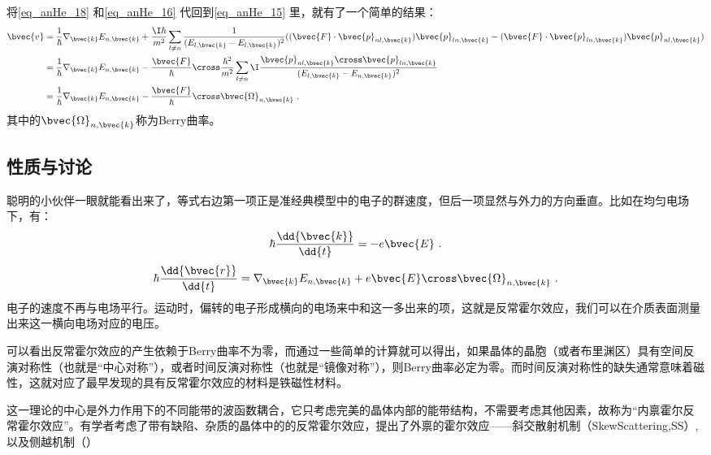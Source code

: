 将\autoref{eq_anHe_18} 和\autoref{eq_anHe_16} 代回到\autoref{eq_anHe_15} 里，就有了一个简单的结果：
\begin{equation}
\begin{aligned}
\bvec{v}&=\frac{1}{\hbar}\nabla_{\bvec{k}}E_{n,\bvec{k}}+\frac{\I\hbar}{m^2}\sum_{l\neq n}\frac{1}{(E_{l,\bvec{k}}-E_{l,\bvec{k}})^2}((\bvec{F}\cdot\bvec{p}_{nl,\bvec{k}})\bvec{p}_{ln,\bvec{k}}-(\bvec{F}\cdot\bvec{p}_{ln,\bvec{k}})\bvec{p}_{nl,\bvec{k}})\\
&=\frac{1}{\hbar}\nabla_{\bvec{k}}E_{n,\bvec{k}}-\frac{\bvec{F}}{\hbar}\cross\frac{\hbar^2}{m^2}\sum_{l\neq n}\I\frac{\bvec{p}_{nl,\bvec{k}}\cross\bvec{p}_{ln,\bvec{k}}}{(E_{l,\bvec{k}}-E_{n,\bvec{k}})^2}\\
&=\frac{1}{\hbar}\nabla_{\bvec{k}}E_{n,\bvec{k}}-\frac{\bvec{F}}{\hbar}\cross\bvec{\Omega}_{n,\bvec{k}}~.
\end{aligned}
\end{equation}
其中的$\bvec{\Omega}_{n,\bvec{k}}$称为Berry曲率。

\subsection{性质与讨论}
聪明的小伙伴一眼就能看出来了，等式右边第一项正是准经典模型中的电子的群速度，但后一项显然与外力的方向垂直。比如在均匀电场下，有：
\begin{equation}
\hbar\frac{\dd{\bvec{k}}}{\dd{t}}=-e\bvec{E}~.
\end{equation}
\begin{equation}
\hbar\frac{\dd{\bvec{r}}}{\dd{t}}=\nabla_{\bvec{k}}E_{n,\bvec{k}}+e\bvec{E}\cross\bvec{\Omega}_{n,\bvec{k}}~.
\end{equation}
电子的速度不再与电场平行。运动时，偏转的电子形成横向的电场来中和这一多出来的项，这就是反常霍尔效应，我们可以在介质表面测量出来这一横向电场对应的电压。

可以看出反常霍尔效应的产生依赖于Berry曲率不为零，而通过一些简单的计算就可以得出，如果晶体的晶胞（或者布里渊区）具有空间反演对称性（也就是“中心对称”），或者时间反演对称性（也就是“镜像对称”），则Berry曲率必定为零。而时间反演对称性的缺失通常意味着磁性，这就对应了最早发现的具有反常霍尔效应的材料是铁磁性材料。

这一理论的中心是外力作用下的不同能带的波函数耦合，它只考虑完美的晶体内部的能带结构，不需要考虑其他因素，故称为“内禀霍尔反常霍尔效应”。有学者考虑了带有缺陷、杂质的晶体中的的反常霍尔效应，提出了外禀的霍尔效应——斜交散射机制（SkewScattering,SS）,以及侧越机制（）





